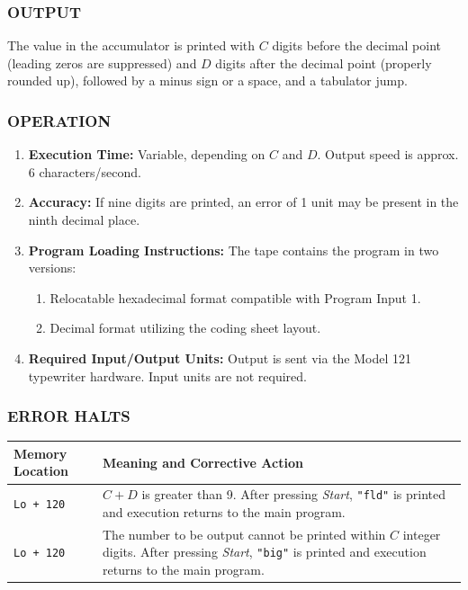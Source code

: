 \subsubsection*{OUTPUT}
The value in the accumulator is printed with $C$ digits before the decimal point (leading zeros are suppressed) and $D$ digits after the decimal point (properly rounded up), followed by a minus sign or a space, and a tabulator jump.

\subsubsection*{OPERATION}
\begin{enumerate}
    \item \textbf{Execution Time:} Variable, depending on $C$ and $D$. Output speed is approx. 6 characters/second.
    \item \textbf{Accuracy:} If nine digits are printed, an error of 1 unit may be present in the ninth decimal place.
    \item \textbf{Program Loading Instructions:} The tape contains the program in two versions:
    \begin{enumerate}[label=\alph*)]
        \item Relocatable hexadecimal format compatible with Program Input 1.
        \item Decimal format utilizing the coding sheet layout.
    \end{enumerate}
    \item \textbf{Required Input/Output Units:} Output is sent via the Model 121 typewriter hardware. Input units are not required.
\end{enumerate}

\subsubsection*{ERROR HALTS}
\begin{center}
\begin{tabularx}{\textwidth}{lX}
    \toprule
    \textbf{Memory Location} & \textbf{Meaning and Corrective Action} \\
    \midrule
    \texttt{Lo + 120} & $C + D$ is greater than 9. After pressing \textit{Start}, \texttt{"fld"} is printed and execution returns to the main program. \\
    \midrule
    \texttt{Lo + 120} & The number to be output cannot be printed within $C$ integer digits. After pressing \textit{Start}, \texttt{"big"} is printed and execution returns to the main program. \\
    \bottomrule
\end{tabularx}
\end{center}

